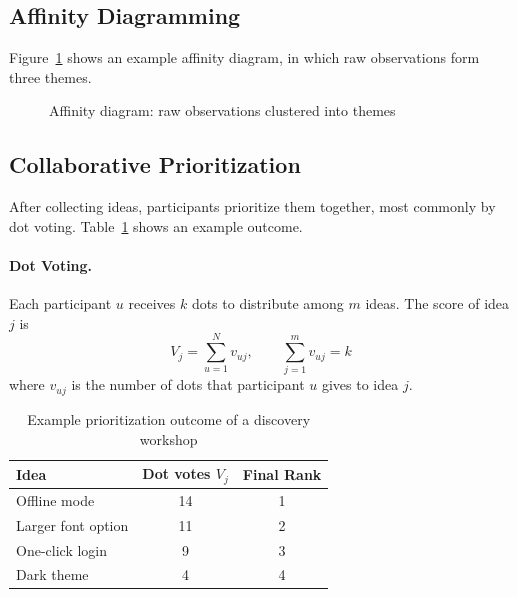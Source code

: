 \documentclass[a4paper,12pt]{article}
\begin{document}
\subsection{Affinity Diagramming}
Figure~\ref{fig:affinity} shows an example affinity diagram, in which raw observations form three themes.
\begin{figure}[H]
\centering
{}
\caption{Affinity diagram: raw observations clustered into themes}
\label{fig:affinity}
\end{figure}

\subsection{Collaborative Prioritization}
After collecting ideas, participants prioritize them together, most commonly by dot voting. Table~\ref{tab:vote} shows an example outcome.

\paragraph{Dot Voting.} Each participant $u$ receives $k$ dots to distribute among $m$ ideas. The score of idea $j$ is
\begin{equation}
    V_j = \sum_{u=1}^{N} v_{uj}, \qquad \sum_{j=1}^{m} v_{uj} = k
\end{equation}
where $v_{uj}$ is the number of dots that participant $u$ gives to idea $j$.

\begin{table}[H]
\centering
\begin{tabular}{@{}lcc@{}}
\toprule
\rowcolor{myblue!20} \textbf{Idea} & \textbf{Dot votes $V_j$} & \textbf{Final Rank} \\
\midrule
Offline mode      & 14 & 1 \\
Larger font option & 11 & 2 \\
One-click login   & 9  & 3 \\
Dark theme        & 4  & 4 \\
\bottomrule
\end{tabular}
\caption{Example prioritization outcome of a discovery workshop }
\label{tab:vote}
\end{table}
\end{document}
